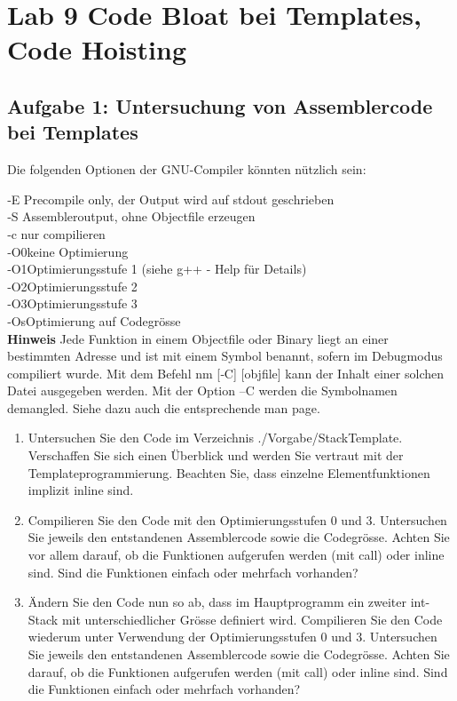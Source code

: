 \section{Lab 9 Code Bloat bei Templates, Code Hoisting}
\subsection{Aufgabe 1: Untersuchung von Assemblercode bei Templates}

Die folgenden Optionen der GNU-Compiler könnten nützlich sein:

‐E \qquad  Precompile only, der Output wird auf stdout geschrieben\\
‐S \qquad Assembleroutput, ohne Objectfile erzeugen\\
‐c \qquad nur compilieren\\
‐O0\quad  keine Optimierung\\
‐O1\quad  Optimierungsstufe 1 (siehe g++ - Help für Details)\\
‐O2\quad  Optimierungsstufe 2\\
‐O3\quad  Optimierungsstufe 3\\
‐Os\quad  Optimierung auf Codegrösse\\

\textbf{Hinweis}
Jede Funktion in einem Objectfile oder Binary liegt an einer bestimmten Adresse und ist mit einem Symbol benannt, sofern im Debugmodus compiliert wurde. Mit dem Befehl nm [‐C] [objfile] kann der Inhalt einer solchen Datei ausgegeben werden. Mit der Option –C werden die Symbolnamen demangled. Siehe dazu auch die entsprechende man page.

\begin{enumerate}
  \item  Untersuchen Sie den Code im Verzeichnis ./Vorgabe/StackTemplate. Verschaffen Sie sich einen Überblick und werden Sie vertraut mit der Templateprogrammierung. Beachten Sie, dass einzelne Elementfunktionen implizit inline sind.
  \item Compilieren Sie den Code mit den Optimierungsstufen 0 und 3. Untersuchen Sie jeweils den entstandenen Assemblercode sowie die Codegrösse. Achten Sie vor allem darauf, ob die Funktionen aufgerufen werden (mit call) oder inline sind. Sind die Funktionen einfach oder mehrfach vorhanden?
  \item Ändern Sie den Code nun so ab, dass im Hauptprogramm ein zweiter int-Stack mit unterschiedlicher Grösse definiert wird. Compilieren Sie den Code wiederum unter Verwendung der Optimierungsstufen 0 und 3. Untersuchen Sie jeweils den entstandenen Assemblercode sowie die Codegrösse. Achten Sie darauf, ob die Funktionen aufgerufen werden (mit call) oder inline sind. Sind die Funktionen einfach oder mehrfach vorhanden?
\end{enumerate}

